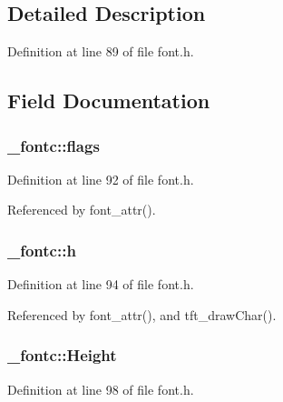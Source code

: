 \subsection{Detailed Description}


Definition at line 89 of file font.\-h.



\subsection{Field Documentation}
\hypertarget{struct__fontc_aa74d9a5513b529b5e444f283afea40ef}{
\subsubsection[{flags}]{ \-\_\-fontc\-::flags}}\label{struct__fontc_aa74d9a5513b529b5e444f283afea40ef}


Definition at line 92 of file font.\-h.



Referenced by font\-\_\-attr().

\hypertarget{struct__fontc_a9feb8c838dfc1d4eebb15c8e53981944}{
\subsubsection[{h}]{ \-\_\-fontc\-::h}}\label{struct__fontc_a9feb8c838dfc1d4eebb15c8e53981944}


Definition at line 94 of file font.\-h.



Referenced by font\-\_\-attr(), and tft\-\_\-draw\-Char().

\hypertarget{struct__fontc_a98f97c237dfb1027c38813a17ef6dcd6}{
\subsubsection[{Height}]{ \-\_\-fontc\-::\-Height}}\label{struct__fontc_a98f97c237dfb1027c38813a17ef6dcd6}


Definition at line 98 of file font.\-h.




